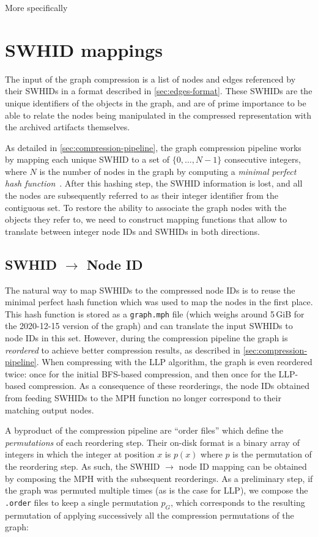 More specifically %


\section{SWHID mappings}

The input of the graph compression is a list of nodes and edges referenced by
their \glspl{SWHID} in a format described in \cref{sec:edges-format}. These
\glspl{SWHID} are the unique identifiers of the objects in the graph, and are
of prime importance to be able to relate the nodes being manipulated in the
compressed representation with the archived artifacts themselves.

As detailed in \cref{sec:compression-pipeline}, the graph compression pipeline
works by mapping each unique \gls{SWHID} to a set of $\{0,\ldots,N-1\}$
consecutive integers, where $N$ is the number of nodes in the graph by
computing a \emph{minimal perfect hash function}~\cite{GOVFSCF}.
After this hashing step, the \gls{SWHID} information is lost, and all the nodes
are subsequently referred to as their integer identifier from the contiguous
set. To restore the ability to associate the graph nodes with the objects they
refer to, we need to construct mapping functions that allow to translate
between integer node IDs and \glspl{SWHID} in both directions.

\subsection{SWHID $\to$ Node ID}%
\label{sec:swhid2node}

The natural way to map \glspl{SWHID} to the compressed node IDs is to reuse the
minimal perfect hash function which was used to map the nodes in the first
place.
This hash function is stored as a \texttt{graph.mph} file (which weighs
around 5\,GiB for the 2020-12-15 version of the graph) and can translate the
input \glspl{SWHID} to node IDs in this set. However, during the compression
pipeline the graph is \emph{reordered} to achieve better compression results,
as described in \cref{sec:compression-pipeline}. When compressing with the
\gls{LLP} algorithm, the graph is even reordered twice: once for the initial
BFS-based compression, and then once for the LLP-based compression. As a
consequence of these reorderings, the node IDs obtained from feeding
\glspl{SWHID} to the \gls{MPH} function no longer correspond to their matching
output nodes.

A byproduct of the compression pipeline are ``order files'' which define
the \emph{permutations} of each reordering step. Their on-disk format is a
binary array of integers in which the integer at position $x$ is $p(x)$ where
$p$ is the permutation of the reordering step. As such, the \gls{SWHID} $\to$
node ID mapping can be obtained by composing the MPH with the subsequent
reorderings. As a preliminary step, if the graph was permuted multiple times
(as is the case for \gls{LLP}), we compose the \texttt{.order} files to keep a
single permutation $p_G$, which corresponds to the resulting permutation of
applying successively all the compression permutations of the graph:

